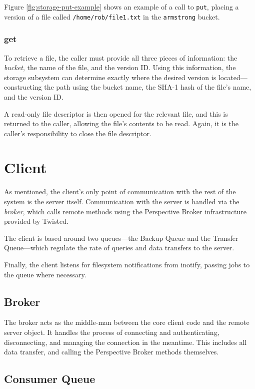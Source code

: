 Figure \ref{fig:storage-put-example} shows an example of a call to \verb!put!,
placing a version of a file called \verb!/home/rob/file1.txt! in the
\verb!armstrong! bucket.

\subsubsection{get}

To retrieve a file, the caller must provide all three pieces of information:
the \emph{bucket}, the name of the file, and the version ID. Using this
information, the storage subsystem can determine exactly where the desired
version is located---constructing the path using the bucket name, the SHA-1
hash of the file's name, and the version ID.

A read-only file descriptor is then opened for the relevant file, and this is
returned to the caller, allowing the file's contents to be read. Again, it is
the caller's responsibility to close the file descriptor.

\section{Client}

As mentioned, the client's only point of communication with the rest of the
system is the server itself. Communication with the server is handled via the
\emph{broker}, which calls remote methods using the Perspective Broker
infrastructure provided by Twisted.

The client is based around two queues---the Backup Queue and the Transfer
Queue---which regulate the rate of queries and data transfers to the server.

Finally, the client listens for filesystem notifications from inotify, passing
jobs to the queue where necessary.

\subsection{Broker}
\label{sec:implementation-broker}

The broker acts as the middle-man between the core client code and the remote
server object. It handles the process of connecting and authenticating,
disconnecting, and managing the connection in the meantime. This includes all
data transfer, and calling the Perspective Broker methods themselves.

\subsection{Consumer Queue}
\label{sec:implementation-consumer-queue}

